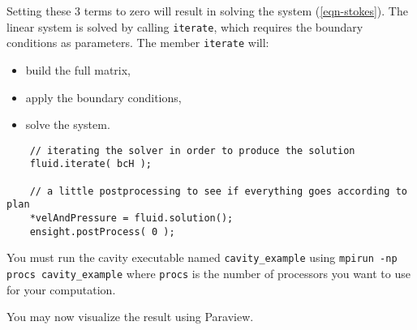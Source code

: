 Setting these 3 terms to zero will result in solving the system (\ref{eqn-stokes}).
The linear system is solved by calling \verb!iterate!, which requires the boundary conditions
as parameters. The member \verb!iterate! will:
\begin{itemize}
\item build the full matrix,
\item apply the boundary conditions,
\item solve the system.
\end{itemize}

\begin{verbatim}
    // iterating the solver in order to produce the solution
    fluid.iterate( bcH );

    // a little postprocessing to see if everything goes according to plan
    *velAndPressure = fluid.solution();
    ensight.postProcess( 0 );

\end{verbatim}

You must run the cavity executable named \verb!cavity_example! using 
\verb!mpirun -np procs cavity_example! where \verb!procs! is the number 
of processors you want to use for your computation. 



You may now visualize the result using Paraview.

%
%
